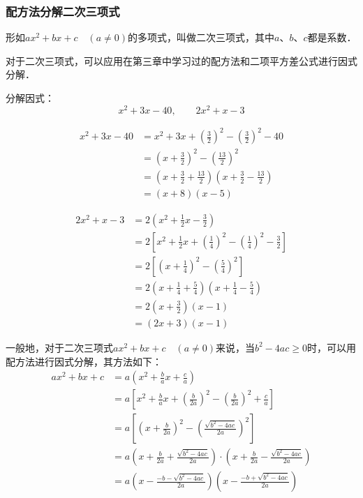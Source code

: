 \subsubsection{配方法分解二次三项式}
形如$ax^2+bx+c\quad (a\ne 0)$的多项式，叫做二次三项式，其中$a$、$b$、$c$都是系数．

对于二次三项式，可以应用在第三章中学习过的配方法和二项平方差公式进行因式分解．
\begin{example}
    分解因式：
\[x^2+3x-40,\qquad 2x^2+x-3\]
\end{example}

\begin{solution}
\[\begin{split}
    x^2+3x-40&=x^2+3x+\left(\frac{3}{2}\right)^2-\left(\frac{3}{2}\right)^2-40\\
    &=\left(x+\frac{3}{2}\right)^2-\left(\frac{13}{2}\right)^2\\
    &=\left(x+\frac{3}{2}+\frac{13}{2}\right)\left(x+\frac{3}{2}-\frac{13}{2}\right)\\
    &=(x+8)(x-5)
\end{split}\]

\[\begin{split}
    2x^2+x-3&=2\left(x^2+\frac{1}{2}x-\frac{3}{2}\right)\\
    &=2\left[x^2+\frac{1}{2}x+\left(\frac{1}{4}\right)^2-\left(\frac{1}{4}\right)^2-\frac{3}{2} \right]\\
    &=2\left[\left(x+\frac{1}{4}\right)^2-\left(\frac{5}{4}\right)^2\right]\\
    &=2\left(x+\frac{1}{4}+\frac{5}{4}\right)
   \left(x+\frac{1}{4}-\frac{5}{4}\right) \\
&=2\left(x+\frac{3}{2}\right)\left(x-1\right)\\
&=(2x+3)(x-1)
\end{split}\]
\end{solution}

一般地，对于二次三项式$ax^2+bx+c\quad (a\ne 0)$来说，当$b^2-4ac\ge 0$时，可以用配方法进行因式分解，其方法如下：
\[\begin{split}
    ax^2+bx+c &=a\left(x^2+\frac{b}{a}x+\frac{c}{a}\right)\\
    &=a\left[x^2+\frac{b}{a}x+\left(\frac{b}{2a}\right)^2-\left(\frac{b}{2a}\right)^2+\frac{c}{a}\right]\\
    &=a\left[\left(x+\frac{b}{2a}\right)^2-\left(\frac{\sqrt{b^2-4ac}}{2a}\right)^2\right]\\
    &=a\left(x+\frac{b}{2a}+\frac{\sqrt{b^2-4ac}}{2a}\right)\cdot \left(x+\frac{b}{2a}-\frac{\sqrt{b^2-4ac}}{2a}\right)\\
    &=a\left(x-\frac{-b-\sqrt{b^2-4ac}}{2a}\right)\left(x-\frac{-b+\sqrt{b^2-4ac}}{2a}\right)
\end{split}\]

